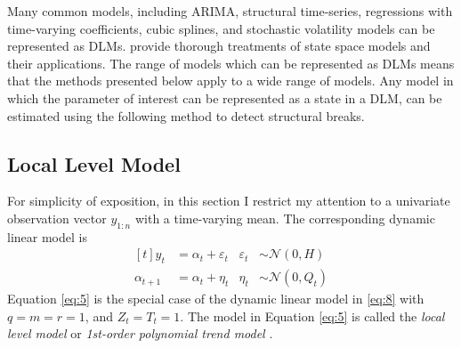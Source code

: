 \documentclass{article}
\newcommand{\dist}[1]{\mathcal{#1}}
\newcommand{\paren}[1]{\ensuremath{\left(#1\right)}}
\newcommand{\dnorm}[1]{\ensuremath{\dist{N}\paren{#1}}}
\begin{document}
Many common models, including ARIMA, structural time-series, regressions with time-varying coefficients, cubic splines, and stochastic volatility models can be represented as DLMs. 
\textcites{WestHarrison1997}{DurbinKoopman2001}{CommandeurKoopman2007}{PetrisPetroneEtAl2009}{ShumwayStoffer2010} provide thorough treatments of state space models and their applications.
The range of models which can be represented as DLMs means that the methods presented below apply to a wide range of models.
Any model in which the parameter of interest can be represented as a state in a DLM, can be estimated using the following method to detect structural breaks.

\subsection{Local Level Model}
\label{sec:local-level-model}

For simplicity of exposition, in this section I restrict my attention to a univariate observation vector $y_{1:n}$ with a time-varying mean.
The corresponding dynamic linear model is
\begin{equation}
  \label{eq:5}
  \begin{aligned}[t]
    y_{t} &= \alpha_{t} + \varepsilon_{t} & \varepsilon_{t} & \sim \dnorm{0, H} \\
    \alpha_{t + 1} &= \alpha_{t} + \eta_{t} & \eta_{t} & \sim \dnorm{0, Q_{t}}
  \end{aligned}
\end{equation}
Equation \eqref{eq:5} is the special case of the dynamic linear model in \eqref{eq:8} with $q = m = r = 1$, and $Z_{t} = T_{t} = 1$.
The model in Equation \eqref{eq:5} is called the \textit{local level model} \parencites[Chapter 2][]{DurbinKoopman2001} or \textit{1st-order polynomial trend model} \parencite[Chapter 2]{WestHarrison1997}.
\end{document}
